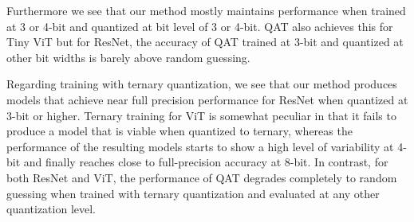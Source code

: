 Furthermore we see that our method mostly maintains performance when trained at 3 or 4-bit and quantized at bit level of 3 or 4-bit. QAT also achieves this for Tiny ViT but for ResNet, the accuracy of QAT trained at 3-bit and quantized at other bit widths is barely above random guessing.

Regarding training with ternary quantization, we see that  our method produces models that achieve near full precision performance for ResNet when quantized at 3-bit or higher. Ternary training for ViT is somewhat peculiar in that it fails to produce a model that is viable when quantized to ternary, whereas the performance of the resulting models starts to show a high level of variability at 4-bit and finally reaches close to full-precision accuracy at 8-bit. In contrast, for both ResNet and ViT, the performance of QAT degrades completely to random guessing when trained with ternary quantization and evaluated at any other quantization level. 

